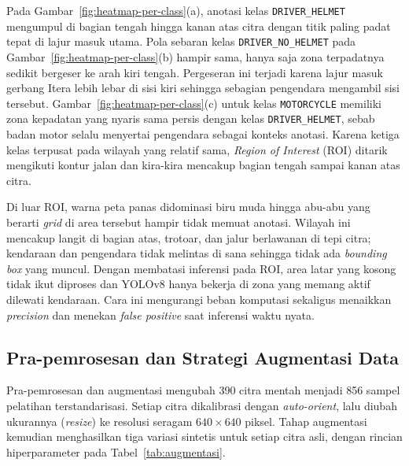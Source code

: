 Pada Gambar~\ref{fig:heatmap-per-class}(a), anotasi kelas \texttt{DRIVER\_HELMET} mengumpul di bagian tengah hingga kanan atas citra dengan titik paling padat tepat di lajur masuk utama. Pola sebaran kelas \texttt{DRIVER\_NO\_HELMET} pada Gambar~\ref{fig:heatmap-per-class}(b) hampir sama, hanya saja zona terpadatnya sedikit bergeser ke arah kiri tengah. Pergeseran ini terjadi karena lajur masuk gerbang Itera lebih lebar di sisi kiri sehingga sebagian pengendara mengambil sisi tersebut. Gambar~\ref{fig:heatmap-per-class}(c) untuk kelas \texttt{MOTORCYCLE} memiliki zona kepadatan yang nyaris sama persis dengan kelas \texttt{DRIVER\_HELMET}, sebab badan motor selalu menyertai pengendara sebagai konteks anotasi. Karena ketiga kelas terpusat pada wilayah yang relatif sama, \textit{Region of Interest} (ROI) ditarik mengikuti kontur jalan dan kira-kira mencakup bagian tengah sampai kanan atas citra.

Di luar ROI, warna peta panas didominasi biru muda hingga abu-abu yang berarti \textit{grid} di area tersebut hampir tidak memuat anotasi. Wilayah ini mencakup langit di bagian atas, trotoar, dan jalur berlawanan di tepi citra; kendaraan dan pengendara tidak melintas di sana sehingga tidak ada \textit{bounding box} yang muncul. Dengan membatasi inferensi pada ROI, area latar yang kosong tidak ikut diproses dan YOLOv8 hanya bekerja di zona yang memang aktif dilewati kendaraan. Cara ini mengurangi beban komputasi sekaligus menaikkan \textit{precision} dan menekan \textit{false positive} saat inferensi waktu nyata.

\subsection{Pra-pemrosesan dan Strategi Augmentasi Data}
\label{subsec:preprocessing-augmentasi}

Pra-pemrosesan dan augmentasi mengubah 390 citra mentah menjadi 856 sampel pelatihan terstandarisasi. Setiap citra dikalibrasi dengan \textit{auto-orient}, lalu diubah ukurannya (\textit{resize}) ke resolusi seragam $640 \times 640$ piksel. Tahap augmentasi kemudian menghasilkan tiga variasi sintetis untuk setiap citra asli, dengan rincian hiperparameter pada Tabel~\ref{tab:augmentasi}.

